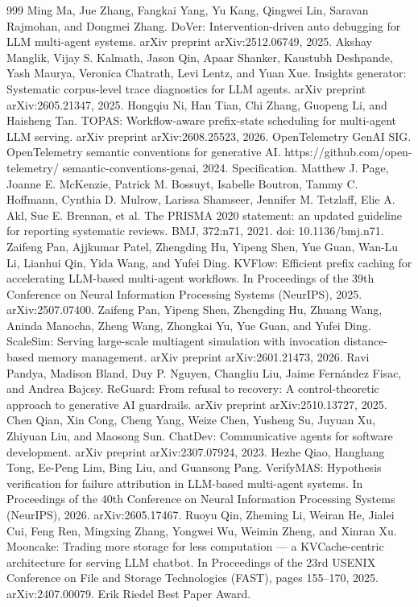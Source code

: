 \documentclass[preprint,12pt]{elsarticle}
\begin{document}
\begin{thebibliography}{999}
 Ming Ma, Jue Zhang, Fangkai Yang, Yu Kang, Qingwei Lin, Saravan Rajmohan, and Dongmei Zhang. DoVer: Intervention-driven auto debugging for LLM multi-agent systems. arXiv preprint arXiv:2512.06749, 2025.
 Akshay Manglik, Vijay S. Kalmath, Jason Qin, Apaar Shanker, Kaustubh Deshpande, Yash Maurya, Veronica Chatrath, Levi Lentz, and Yuan Xue. Insights generator: Systematic corpus-level trace diagnostics for LLM agents. arXiv preprint arXiv:2605.21347, 2025.
 Hongqiu Ni, Han Tian, Chi Zhang, Guopeng Li, and Haisheng Tan. TOPAS: Workflow-aware prefix-state scheduling for multi-agent LLM serving. arXiv preprint arXiv:2608.25523, 2026.
 OpenTelemetry GenAI SIG. OpenTelemetry semantic conventions for generative AI. https://github.com/open-telemetry/ semantic-conventions-genai, 2024. Specification.
 Matthew J. Page, Joanne E. McKenzie, Patrick M. Bossuyt, Isabelle Boutron, Tammy C. Hoffmann, Cynthia D. Mulrow, Larissa Shamseer, Jennifer M. Tetzlaff, Elie A. Akl, Sue E. Brennan, et al. The PRISMA 2020 statement: an updated guideline for reporting systematic reviews. BMJ, 372:n71, 2021. doi: 10.1136/bmj.n71.
 Zaifeng Pan, Ajjkumar Patel, Zhengding Hu, Yipeng Shen, Yue Guan, Wan-Lu Li, Lianhui Qin, Yida Wang, and Yufei Ding. KVFlow: Efficient prefix caching for accelerating LLM-based multi-agent workflows. In Proceedings of the 39th Conference on Neural Information Processing Systems (NeurIPS), 2025. arXiv:2507.07400.
 Zaifeng Pan, Yipeng Shen, Zhengding Hu, Zhuang Wang, Aninda Manocha, Zheng Wang, Zhongkai Yu, Yue Guan, and Yufei Ding. ScaleSim: Serving large-scale multiagent simulation with invocation distance-based memory management. arXiv preprint arXiv:2601.21473, 2026.
 Ravi Pandya, Madison Bland, Duy P. Nguyen, Changliu Liu, Jaime Fernández Fisac, and Andrea Bajcsy. ReGuard: From refusal to recovery: A control-theoretic approach to generative AI guardrails. arXiv preprint arXiv:2510.13727, 2025.
 Chen Qian, Xin Cong, Cheng Yang, Weize Chen, Yusheng Su, Juyuan Xu, Zhiyuan Liu, and Maosong Sun. ChatDev: Communicative agents for software development. arXiv preprint arXiv:2307.07924, 2023.
 Hezhe Qiao, Hanghang Tong, Ee-Peng Lim, Bing Liu, and Guansong Pang. VerifyMAS: Hypothesis verification for failure attribution in LLM-based multi-agent systems. In Proceedings of the 40th Conference on Neural Information Processing Systems (NeurIPS), 2026. arXiv:2605.17467.
 Ruoyu Qin, Zheming Li, Weiran He, Jialei Cui, Feng Ren, Mingxing Zhang, Yongwei Wu, Weimin Zheng, and Xinran Xu. Mooncake: Trading more storage for less computation --- a KVCache-centric architecture for serving LLM chatbot. In Proceedings of the 23rd USENIX Conference on File and Storage Technologies (FAST), pages 155--170, 2025. arXiv:2407.00079. Erik Riedel Best Paper Award.

\end{thebibliography}
\end{document}
